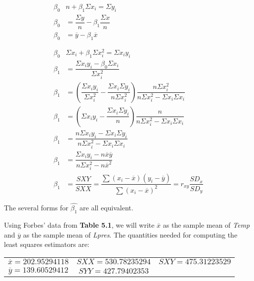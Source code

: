 \documentclass{article}
\begin{document}
    \begin{align} 
        \beta_{0} &n + \beta_{1} \Sigma x_{i} = \Sigma y_{i}                \nonumber \\
        \beta_{0} &= \dfrac {\Sigma y}{n} - \beta_{1}  \dfrac {\Sigma x}{n} \nonumber \\
        \beta_{0} &= \overline{y} - \beta_{1}  \overline{x}                 \\
        \nonumber \\
        \nonumber \\
        \beta_{0} &\Sigma x_{i} + \beta_{1} \Sigma x_{i}^2 = \Sigma x_{i} y_{i} \nonumber \\
        \beta_{1} &= \dfrac{\Sigma x_{i}y_{i} - \beta _{0} \Sigma x_{i} }{ \Sigma x_{i}^2} \nonumber \\
        \beta_{1} &= \left ( \dfrac{\Sigma x_{i}y_{i}}{\Sigma x_{i}^2} - \dfrac{\Sigma x_{i} \Sigma y_{i}}{n \Sigma x_{i}^2} \right ) 
        \dfrac{n \Sigma x_{i}^2}{n\Sigma x_{i}^2 - \Sigma x_{i} \Sigma x_{i}} \nonumber \\
        \beta_{1} &= \left ( \Sigma x_{i}y_{i} - \dfrac{\Sigma x_{i} \Sigma y_{i}}{n} \right ) 
        \dfrac{n}{n\Sigma x_{i}^2 - \Sigma x_{i} \Sigma x_{i}} \nonumber \\
        \beta_{1} &= \dfrac{n \Sigma x_{i} y_{i} - \Sigma x_{i} \Sigma y_{i}}{n \Sigma x_{i}^2 - \Sigma x_{i} \Sigma x_{i}} \nonumber \\
        \beta_{1} &= \dfrac{\Sigma x_{i} y_{i} - n \overline{x} \overline{y}}{n \Sigma x_{i}^2 - n \overline{x}^2} \nonumber \\
        \beta_{1} &= \dfrac{SXY}{SXX} = \dfrac
        {\displaystyle\sum(x_{i}-\overline{x})(y_{i}-\overline{y})}
        {\displaystyle \sum {\left(x_{i} - \overline{x}\right)}^2} 
        = r_{xy} \dfrac{SD_{x}}{SD_{y}}
    \end{align}
    
    The several forms for $\hat{\beta_{1}}$ are all equivalent.
    
    
    Using Forbes’ data from \textbf{Table 5.1}, we will write $\overline{x}$ as the sample mean of \textit{Temp} and $\overline{y}$ as the sample mean of \textit{Lpres}. The quantities needed for computing the least squares estimators are: 
    
    \begin{center}
        \begin{tabular}{c c c}
            $\overline{x} = 202.95294118 $ & $SXX = 530.78235294 $ & $SXY = 475.31223529 $ \\
            $\overline{y} = 139.60529412 $ & $SYY = 427.79402353 $
        \end{tabular}
    \end{center}
    
\end{document}
